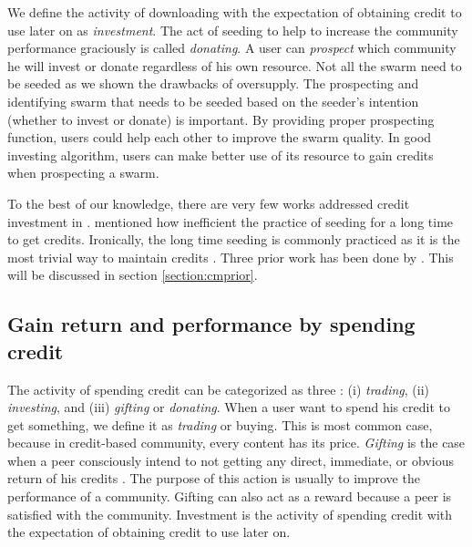 We define the activity of downloading with the expectation of obtaining credit to use later on as \textit{investment}. The act of seeding to help to increase the community performance graciously is called \textit{donating}. A user can \textit{prospect} which community he will invest or donate regardless of his own resource. Not all the swarm need to be seeded as we shown the drawbacks of oversupply. The prospecting and identifying swarm that needs to be seeded based on the seeder's intention (whether to invest or donate) is important. By providing proper prospecting function, users could help each other to improve the swarm quality. In good investing algorithm, users can make better use of its resource to gain credits when prospecting a swarm. 

To the best of our knowledge, there are very few works addressed credit investment in \bt. \citeauthor{2013:survivepriv:jia} mentioned how inefficient the practice of seeding for a long time to get credits. Ironically, the long time seeding is commonly practiced as it is the most trivial way to maintain credits \cite{2013:survivepriv:jia}. Three prior work has been done by \citeauthor{2015:creditmining:capota} \cite{2015:creditmining:capota, 2013:investmentcm:capota, 2014:bwmarket:capota}. This will be discussed in section \ref{section:cmprior}. 

\subsection{Gain return and performance by spending credit}
The activity of spending credit can be categorized as three : (i) \textit{trading}, (ii) \textit{investing}, and (iii) \textit{gifting} or \textit{donating}. When a user want to spend his credit to get something, we define it as \textit{trading} or buying. This is most common case, because in credit-based community, every content has its price. \textit{Gifting} is the case when a peer consciously intend to not getting any direct, immediate, or obvious return of his credits \cite{2006:gifting:ripeanu}. The purpose of this action is usually to improve the performance of a community. Gifting can also act as a reward because a peer is satisfied with the community. Investment is the activity of spending credit with the expectation of obtaining credit to use later on. 

